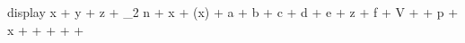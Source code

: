 display
\sin x + \cos y + \tan z + \log_2 n + \ln x + \exp(x) + \arcsin a + \sinh b + \cot c + \sec d + \csc e + \arg z + \ker f + \dim V + \hom + \deg p + \lg x + \arccos + \arctan + \cosh + \tanh + \coth